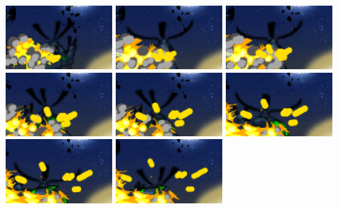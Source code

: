 \documentclass[10pt]{book}
\begin{document}
\begin{center}
\includegraphics[width=0.3\textwidth]{assets/ns-lines-0000.png}
\includegraphics[width=0.3\textwidth]{assets/ns-lines-0001.png}
\includegraphics[width=0.3\textwidth]{assets/ns-lines-0002.png}
\includegraphics[width=0.3\textwidth]{assets/ns-lines-0003.png}
\includegraphics[width=0.3\textwidth]{assets/ns-lines-0004.png}
\includegraphics[width=0.3\textwidth]{assets/ns-lines-0005.png}
\includegraphics[width=0.3\textwidth]{assets/ns-lines-0006.png}
\includegraphics[width=0.3\textwidth]{assets/ns-lines-0007.png}

\end{center}
\end{document}
